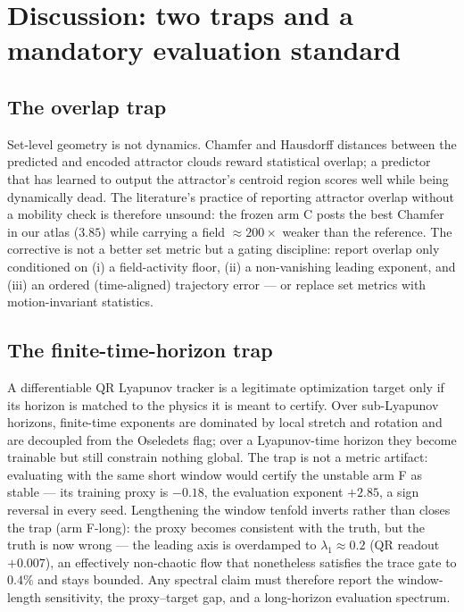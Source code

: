 \documentclass[journal]{IEEEtran}
\begin{document}
\section{Discussion: two traps and a mandatory evaluation standard}
\label{sec:discussion}

\subsection{The overlap trap}
Set-level geometry is not dynamics. Chamfer and Hausdorff distances
between the predicted and encoded attractor clouds reward statistical
overlap; a predictor that has learned to output the attractor's centroid
region scores well while being dynamically dead. The literature's
practice of reporting attractor overlap without a mobility check is
therefore unsound: the frozen arm C posts the best Chamfer in our atlas
($3.85$) while carrying a field $\approx200\times$ weaker than the
reference. The corrective is not a better set metric but a gating
discipline: report overlap only conditioned on (i) a field-activity
floor, (ii) a non-vanishing leading exponent, and (iii) an ordered
(time-aligned) trajectory error --- or replace set metrics with
motion-invariant statistics.

\subsection{The finite-time-horizon trap}
A differentiable QR Lyapunov tracker is a legitimate optimization target
only if its horizon is matched to the physics it is meant to certify.
Over sub-Lyapunov horizons, finite-time exponents are dominated by local
stretch and rotation and are decoupled from the Oseledets flag; over a
Lyapunov-time horizon they become trainable but still constrain nothing
global. The trap is not a metric artifact: evaluating with the same
short window would certify the unstable arm F as stable --- its training
proxy is $-0.18$, the evaluation exponent $+2.85$, a sign reversal in
every seed. Lengthening the window tenfold inverts rather than closes
the trap (arm F-long): the proxy becomes consistent with the truth, but
the truth is now wrong --- the leading axis is overdamped to
$\lambda_1\approx0.2$ (QR readout $+0.007$), an effectively non-chaotic
flow that nonetheless satisfies the trace gate to $0.4\%$ and stays
bounded. Any spectral claim must therefore report the window-length
sensitivity, the proxy--target gap, and a long-horizon evaluation
spectrum.
\end{document}
